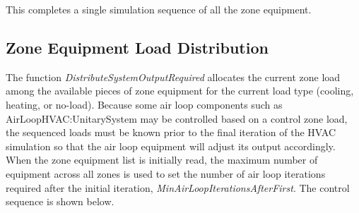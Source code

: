 This completes a single simulation sequence of all the zone equipment.

\subsection{Zone Equipment Load Distribution}\label{zone-equipment-load-distribution}

The function \emph{DistributeSystemOutputRequired} allocates the current zone load among the available pieces of zone equipment for the current load type (cooling, heating, or no-load). Because some air loop components such as AirLoopHVAC:UnitarySystem may be controlled based on a control zone load, the sequenced loads must be known prior to the final iteration of the HVAC simulation so that the air loop equipment will adjust its output accordingly. When the zone equipment list is initially read, the maximum number of equipment across all zones is used to set the number of air loop iterations required after the initial iteration, \emph{MinAirLoopIterationsAfterFirst}. The control sequence is shown below.
